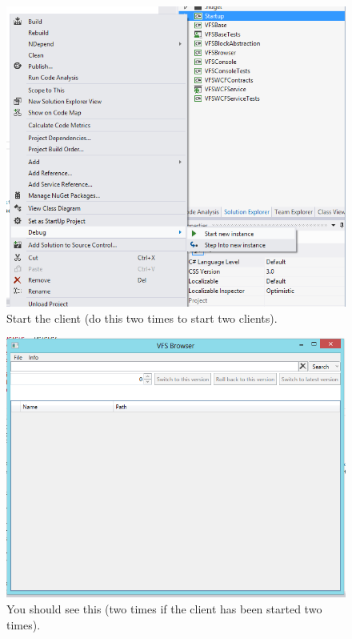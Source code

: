 \documentclass[JCDReport.tex]{subfiles}
\begin{document}
\begin{figure}[h!]
	\centering
	\includegraphics[scale=0.75]{Images/tutorial/3.png} 
	\caption{Start the client (do this two times to start two clients).}
\end{figure}

\begin{figure}[h!]
	\centering
	\includegraphics[scale=0.75]{Images/tutorial/4.png} 
	\caption{You should see this (two times if the client has been started two times).}
\end{figure}
\end{document}

